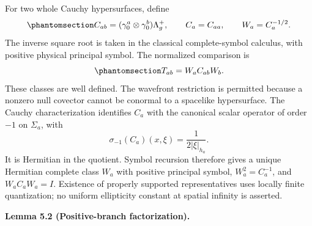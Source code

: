 \documentclass[
  english,
  11pt,
  reqno]{amsart}
\makeatletter
\newcommand{\pandocstatementheading}[1]{%
  \par\if@nobreak\else
    \addpenalty{\@beginparpenalty}%
    \addvspace{.5\baselineskip plus .2\baselineskip minus .2\baselineskip}%
  \fi
  {\normalfont\bfseries #1\par}%
  \nobreak\@afterindenttrue\@afterheading
}
\makeatother
\begin{document}
For two whole Cauchy hypersurfaces, define
\begin{equation}\protect\phantomsection\label{eq:global-mixed-carrier-traces}{
C_{ab}=(\gamma_0^a\otimes\gamma_0^b)\Lambda_g^+,
\qquad C_a=C_{aa},\qquad W_a=C_a^{-1/2}.
}\end{equation} The inverse square root is taken in the classical
complete-symbol calculus, with positive physical principal symbol. The
normalized comparison is
\begin{equation}\protect\phantomsection\label{eq:global-normalized-carrier}{
T_{ab}=W_aC_{ab}W_b.
}\end{equation} These classes are well defined. The wavefront
restriction is permitted because a nonzero null covector cannot be
conormal to a spacelike hypersurface. The Cauchy characterization
identifies \(C_a\) with the canonical scalar operator of order \(-1\) on
\(\Sigma_a\), with \[
\sigma_{-1}(C_a)(x,\xi)=\frac{1}{2|\xi|_{h_a}}.
\] It is Hermitian in the quotient. Symbol recursion therefore gives a
unique Hermitian complete class \(W_a\) with positive principal symbol,
\(W_a^2=C_a^{-1}\), and \(W_aC_aW_a=I\). Existence of properly supported
representatives uses locally finite quantization; no uniform ellipticity
constant at spatial infinity is asserted.

\pandocstatementheading{\protect{}\label{lem:global-positive-graph-factorization}Lemma 5.2 (Positive-branch factorization).}
\end{document}
